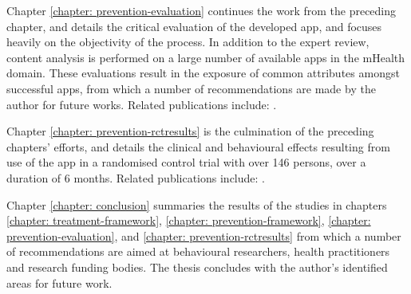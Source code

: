 Chapter \ref{chapter: prevention-evaluation} continues the work from the preceding chapter, and details the  critical evaluation of the developed app, and focuses heavily on the objectivity of the process. In addition to the expert review, content analysis is performed on a large number of available apps in the mHealth domain. These evaluations result in the exposure of common attributes amongst successful apps, from which a number of recommendations are made by the author for future works. 
Related publications include: \cite{Hartin2015-JMIR, Hartin2014-IWAAL, Hartin2015-ICOST, Hartin2014-AAIC, Hartin2015-AAIC, Hartin2015-mHealth, Norton2015-TRCI, Norton2015-AAIC, Weyerman2015}.

Chapter \ref{chapter: prevention-rctresults} is the culmination of the preceding chapters' efforts, and details the clinical and behavioural effects resulting from use of the app in a randomised control trial with over 146 persons, over a duration of 6 months. 
Related publications include: \cite{Hartin2015-JMIR, Hartin2014-IWAAL, Hartin2015-ICOST, Hartin2014-AAIC, Hartin2015-AAIC, Hartin2015-mHealth, Norton2015-TRCI, Norton2015-AAIC, Weyerman2015}.

Chapter \ref{chapter: conclusion} summaries the results of the studies in chapters \ref{chapter: treatment-framework}, \ref{chapter: prevention-framework}, \ref{chapter: prevention-evaluation}, and \ref{chapter: prevention-rctresults} from which a number of recommendations are aimed at behavioural researchers, health practitioners and research funding bodies. The thesis concludes with the author's identified areas for future work.